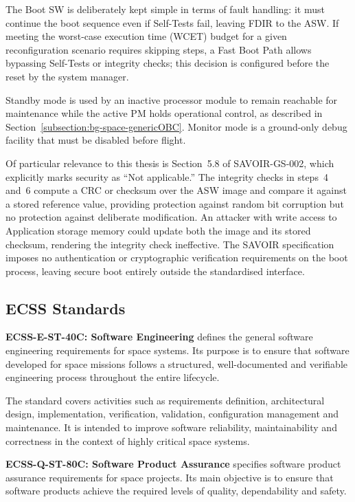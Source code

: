 The Boot SW is deliberately kept simple in terms of fault handling: it must continue the boot sequence even if Self-Tests fail, leaving FDIR to the ASW. If meeting the worst-case execution time (WCET) budget for a given reconfiguration scenario requires skipping steps, a Fast Boot Path allows bypassing Self-Tests or integrity checks; this decision is configured before the reset by the system manager.

Standby mode is used by an inactive processor module to remain reachable for maintenance while the active PM holds operational control, as described in Section~\ref{subsection:bg-space-genericOBC}. Monitor mode is a ground-only debug facility that must be disabled before flight.

Of particular relevance to this thesis is Section~5.8 of SAVOIR-GS-002, which explicitly marks security as ``Not applicable.'' The integrity checks in steps~4 and~6 compute a CRC or checksum over the ASW image and compare it against a stored reference value, providing protection against random bit corruption but no protection against deliberate modification. An attacker with write access to Application storage memory could update both the image and its stored checksum, rendering the integrity check ineffective. The SAVOIR specification imposes no authentication or cryptographic verification requirements on the boot process, leaving secure boot entirely outside the standardised interface.

\subsection{ECSS Standards}
\label{subsection:bg-space-ecss} 

\textbf{ECSS-E-ST-40C: Software Engineering} \cite{ECSS-E-ST-40C} defines the general software engineering requirements for space systems. Its purpose is to ensure that software developed for space missions follows a structured, well-documented and verifiable engineering process throughout the entire lifecycle.

The standard covers activities such as requirements definition, architectural design, implementation, verification, validation, configuration management and maintenance. It is intended to improve software reliability, maintainability and correctness in the context of highly critical space systems.


\textbf{ECSS-Q-ST-80C: Software Product Assurance} \cite{ECSS-Q-ST-80C} specifies software product assurance requirements for space projects. Its main objective is to ensure that software products achieve the required levels of quality, dependability and safety.

